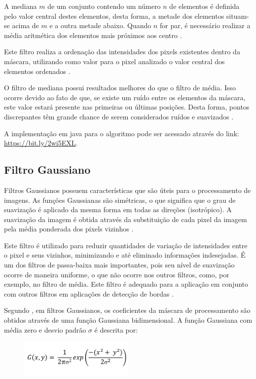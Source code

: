 \documentclass[
	12pt,				%
	oneside,			%
	a4paper,			%
	english,			%
	french,				%
	spanish,			%
	brazil,				%
	]{abntex2}
\begin{document}
A mediana \(m\) de um conjunto contendo um número \(n\) de elementos é definida pelo valor central destes elementos, desta forma, a metade dos elementos situam-se acima de \(m\) e a outra metade abaixo. Quando \(n\) for par, é necessário realizar a média aritmética dos elementos mais próximos aos centro \cite{conciAzevedoLeta:2008}.

Este filtro realiza a ordenação das intensidades dos pixels existentes dentro da máscara, utilizando como valor para o pixel analizado o valor central dos elementos ordenados \cite{conciAzevedoLeta:2008}.

O filtro de mediana possui resultados melhores do que o filtro de média. Isso ocorre devido ao fato de que, se existe um ruído entre os elementos da máscara, este valor estará presente nas primeiras ou últimas posições. Desta forma, pontos discrepantes têm grande chance de serem considerados ruídos e suavizados \cite{conciAzevedoLeta:2008}.

A implementação em java para o algoritmo pode ser acessado através do link: \url{https://bit.ly/2wi5EXL}. 

\subsection{Filtro Gaussiano}
Filtros Gaussianos possuem características que são úteis para o processamento de imagens. As funções Gaussianas são simétricas, o que significa que o grau de suavização é aplicado da mesma forma em todas as direções (isotrópico). A suavização da imagem é obtida através da substituição de cada pixel da imagem pela média ponderada dos pixels vizinhos \cite{pedriniSchwartz:2008}. 

Este filtro é utilizado para reduzir quantidades de variação de intensidades entre o pixel e seus vizinhos, minimizando e até eliminado informações indesejadas. É um dos filtros de passa-baixa mais importantes, pois seu nível de suavização ocorre de maneira uniforme, o que não ocorre nos outros filtros, como, por exemplo, no filtro de média. Este filtro é adequado para a aplicação em conjunto com outros filtros em aplicações de detecção de bordas \cite{conciAzevedoLeta:2008}.   

Segundo \citet{pedriniSchwartz:2008}, em filtros Gaussianos, os coeficientes da máscara de processamento são obtidos através de uma função Gaussiana bidimensional. A função Gaussiana com média zero e desvio padrão \(\sigma\) é descrita por:

\begin{figure}[ht]
\centering
\includegraphics[width=0.5\textwidth]{imagens/gauss_formula.png}
\end{figure}
\end{document}
